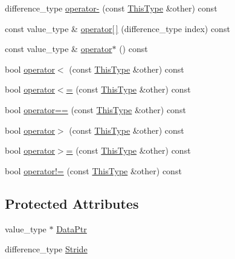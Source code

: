 \begin{DoxyCompactItemize}
\item 
difference\+\_\+type \hyperlink{classvct_var_stride_vector_const_iterator_aae3780e89870a862c5f94813ff14d757}{operator-\/} (const \hyperlink{classvct_var_stride_vector_const_iterator_afd99aad7dc756d227f4fb02cd569d00a}{This\+Type} \&other) const 
\item 
const value\+\_\+type \& \hyperlink{classvct_var_stride_vector_const_iterator_a209f66932b0e8685875ed025b2e60a6c}{operator\mbox{[}$\,$\mbox{]}} (difference\+\_\+type index) const 
\item 
const value\+\_\+type \& \hyperlink{classvct_var_stride_vector_const_iterator_af3a5a1e0eecb4c29c566ff1d96a96645}{operator$\ast$} () const 
\item 
bool \hyperlink{classvct_var_stride_vector_const_iterator_a11b71e83f918383967b42cd9063815b6}{operator$<$} (const \hyperlink{classvct_var_stride_vector_const_iterator_afd99aad7dc756d227f4fb02cd569d00a}{This\+Type} \&other) const 
\item 
bool \hyperlink{classvct_var_stride_vector_const_iterator_ac3633c404d3de1140235e6f7dfabd53d}{operator$<$=} (const \hyperlink{classvct_var_stride_vector_const_iterator_afd99aad7dc756d227f4fb02cd569d00a}{This\+Type} \&other) const 
\item 
bool \hyperlink{classvct_var_stride_vector_const_iterator_ab6f281665cc2181a31c27bc8ea64988d}{operator==} (const \hyperlink{classvct_var_stride_vector_const_iterator_afd99aad7dc756d227f4fb02cd569d00a}{This\+Type} \&other) const 
\item 
bool \hyperlink{classvct_var_stride_vector_const_iterator_aeec0e610900723af49a8532e8727efc8}{operator$>$} (const \hyperlink{classvct_var_stride_vector_const_iterator_afd99aad7dc756d227f4fb02cd569d00a}{This\+Type} \&other) const 
\item 
bool \hyperlink{classvct_var_stride_vector_const_iterator_ab790fe5a4cd924ef5606388eb4e20781}{operator$>$=} (const \hyperlink{classvct_var_stride_vector_const_iterator_afd99aad7dc756d227f4fb02cd569d00a}{This\+Type} \&other) const 
\item 
bool \hyperlink{classvct_var_stride_vector_const_iterator_ab4c7a8b61e07b37ad100b34784c6a3b8}{operator!=} (const \hyperlink{classvct_var_stride_vector_const_iterator_afd99aad7dc756d227f4fb02cd569d00a}{This\+Type} \&other) const 
\end{DoxyCompactItemize}
\subsection*{Protected Attributes}
\begin{DoxyCompactItemize}
\item 
value\+\_\+type $\ast$ \hyperlink{classvct_var_stride_vector_const_iterator_a0aed102854d3d3a2c15214f55640c1b2}{Data\+Ptr}
\item 
difference\+\_\+type \hyperlink{classvct_var_stride_vector_const_iterator_a0b2bb6ca56af29cbf73c6874e86c367e}{Stride}
\end{DoxyCompactItemize}


